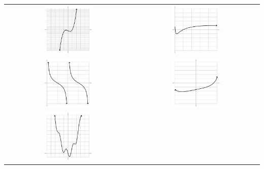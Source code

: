 \begin{questions}
    \begin{center}
      \begin{tabular}{cc}
        \includegraphics[width=0.4\textwidth]{anti1}&
        \includegraphics[width=0.4\textwidth]{anti2}\\
        \includegraphics[width=0.4\textwidth]{anti3}&
        \includegraphics[width=0.4\textwidth]{anti4}\\
        \includegraphics[width=0.4\textwidth]{anti5}&

\end{tabular}
\end{center}
\end{questions}
